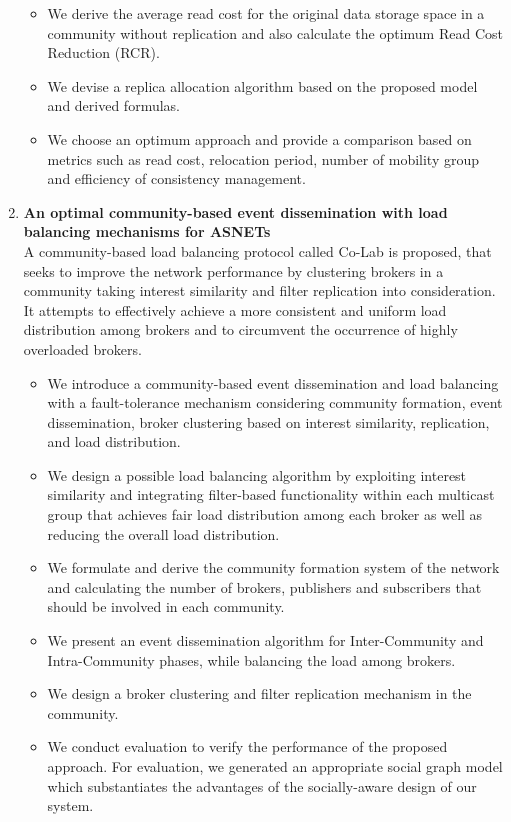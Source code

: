 \begin{enumerate}
\begin{itemize}
            \item We derive the average read cost for the original data storage space in a community without replication and also calculate the optimum Read Cost Reduction (RCR).
            \item We devise a replica allocation algorithm based on the proposed model and derived formulas.
            \item We choose an optimum approach and provide a comparison based on metrics such as read cost, relocation period, number of mobility group and efficiency of consistency management.
        \end{itemize}
    \item \textbf{An optimal community-based event dissemination with load balancing mechanisms for ASNETs }
    \\
    A community-based load balancing protocol called Co-Lab is proposed, that seeks to improve the network performance by clustering brokers in a community taking interest similarity and filter replication into consideration. It attempts to effectively achieve a more consistent and uniform load distribution among brokers and to circumvent the occurrence of highly overloaded brokers.
        \begin{itemize}
            \item We introduce a community-based event dissemination and load balancing with a fault-tolerance mechanism considering community formation, event dissemination, broker clustering based on interest similarity, replication, and load distribution.
            \item We design a possible load balancing algorithm by exploiting interest similarity and integrating filter-based functionality within each multicast group that achieves fair load distribution among each broker as well as reducing the overall load distribution.
            \item We formulate and derive the community formation system of the network and calculating the number of brokers, publishers and subscribers that should be involved in each community.
            \item We present an event dissemination algorithm for Inter-Community and Intra-Community phases, while balancing the load among brokers.
            \item We design a broker clustering and filter replication mechanism in the community.
            \item We conduct evaluation to verify the performance of the proposed approach. For evaluation, we generated an appropriate social graph model which substantiates the advantages of the socially-aware design of our system.

\end{itemize}
\end{enumerate}
